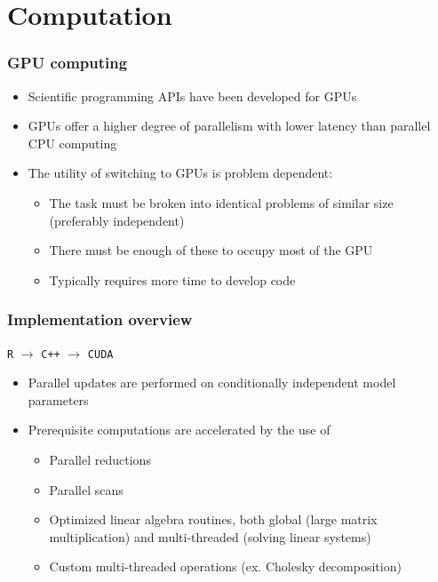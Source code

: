 \documentclass{beamer}
\begin{document}
\section{Computation}

\begin{frame}%
  \frametitle{GPU computing}
  \begin{itemize}
    \item Scientific programming APIs have been developed for GPUs
    \item GPUs offer a higher degree of parallelism with lower latency than parallel CPU computing
    \item The utility of switching to GPUs is problem dependent:
    \begin{itemize}
      \item The task must be broken into identical problems of similar size (preferably independent)
      \item There must be enough of these to occupy most of the GPU
      \item Typically requires more time to develop code
    \end{itemize}
  \end{itemize}
\end{frame}

\begin{frame}%
  \frametitle{Implementation overview}
  \texttt{R} $\rightarrow$ \texttt{C++} $\rightarrow$ \texttt{CUDA}
  \begin{itemize}
    \pause\item Parallel updates are performed on conditionally independent model parameters
    \pause\item Prerequisite computations are accelerated by the use of
    \begin{itemize}
      \pause\item Parallel reductions
      \pause\item Parallel scans
      \pause\item Optimized linear algebra routines, both global (large matrix multiplication) and multi-threaded (solving linear systems)
      \pause\item Custom multi-threaded operations (ex. Cholesky decomposition)
    \end{itemize}
  \end{itemize}
\end{frame}
\end{document}
